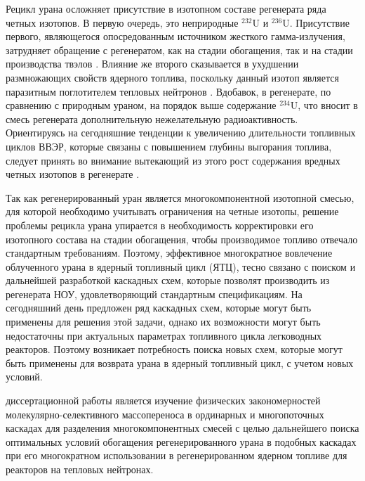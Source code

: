Рецикл урана осложняет присутствие в изотопном составе регенерата ряда четных изотопов. В первую очередь, это неприродные $^{232}$U и $^{236}$U. Присутствие первого, являющегося опосредованным источником жесткого гамма-излучения, затрудняет обращение с регенератом, как на стадии обогащения, так и на стадии производства твэлов \cite{matveevUran232EgoVliyanie1985}. Влияние же второго сказывается в ухудшении размножающих свойств ядерного топлива, поскольку данный изотоп является паразитным поглотителем тепловых нейтронов \cite{dudnikovInfluence236UEfficacy2016}. Вдобавок, в регенерате, по сравнению с природным ураном, на порядок выше содержание $^{234}$U, что вносит в смесь регенерата дополнительную нежелательную радиоактивность. Ориентируясь на сегодняшние тенденции к увеличению длительности топливных циклов ВВЭР, которые связаны с повышением глубины выгорания топлива, следует принять во внимание вытекающий из этого рост содержания вредных четных изотопов в регенерате \cite{smirnovEvolutionIsotopicComposition2012}.

Так как регенерированный уран является многокомпонентной изотопной смесью, для которой необходимо учитывать ограничения на четные изотопы, решение проблемы рецикла урана упирается в необходимость корректировки его изотопного состава на стадии обогащения, чтобы производимое топливо отвечало стандартным требованиям. Поэтому, эффективное многократное вовлечение облученного урана в ядерный топливный цикл (ЯТЦ), тесно связано с поиском и дальнейшей разработкой каскадных схем, которые позволят производить из регенерата НОУ, удовлетворяющий стандартным спецификациям.
На сегодняшний день предложен ряд каскадных схем, которые могут быть применены для решения этой задачи, однако их возможности могут быть недостаточны при актуальных параметрах топливного цикла легководных реакторов. Поэтому возникает потребность поиска новых схем, которые могут быть применены для возврата урана в ядерный топливный цикл, с учетом новых условий. 


{\aim} диссертационной работы является изучение физических закономерностей
молекулярно-селективного массопереноса в ординарных и многопоточных каскадах
для разделения многокомпонентных смесей с целью дальнейшего поиска
оптимальных условий обогащения регенерированного урана в подобных каскадах при
его многократном использовании в регенерированном ядерном топливе для реакторов на тепловых нейтронах. 

